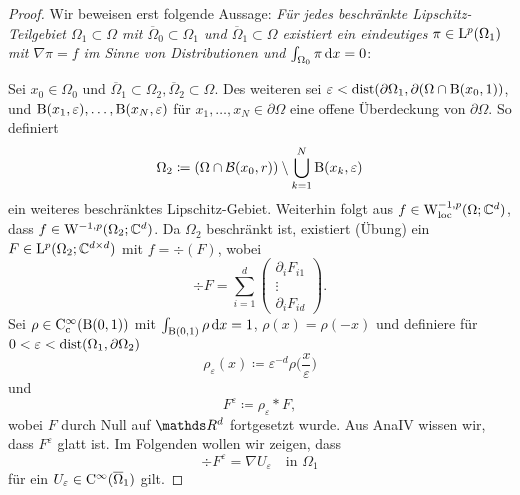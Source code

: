 \begin{proof}
  Wir beweisen erst folgende Aussage: \emph{Für jedes beschränkte Lipschitz-Teilgebiet $\Omega_1 \subset \Omega$ mit $\overline\Omega_0 \subset \Omega_1$ und $\overline\Omega_1 \subset \Omega$ existiert ein eindeutiges $\pi \in \mathrm{L}^p(\Omega_1)$ mit $\nabla\pi = f$ im Sinne von Distributionen und $\int_{\Omega_0} \pi \, {\operatorname{d}\!{x}} = 0$}:

  Sei $x_0 \in \Omega_0$ und $\overline\Omega_1 \subset \Omega_2, \overline\Omega_2 \subset \Omega$.
  Des weiteren sei $\varepsilon < \operatorname{dist}(\partial\Omega_1, \partial(\Omega \cap \mathrm{B}(x_0,1))$, und $\mathrm{B}(x_1,\varepsilon),\dots,\mathrm{B}(x_N,\varepsilon)$ für $x_1,\dots,x_N \in \partial\Omega$ eine offene Überdeckung von $\partial\Omega$.
  So definiert
  $$
  \Omega_2 \coloneqq (\Omega \cap \mathcal{B}(x_0, r)) \setminus \bigcup_{k = 1}^N \mathrm{B}(x_k , \varepsilon)
  $$
  ein weiteres beschränktes Lipschitz-Gebiet.
  Weiterhin folgt aus $f \in \mathrm{W}_{\operatorname{loc}}^{-1,p}(\Omega; \mathbb{C}^d)$, dass $f \in \mathrm{W}^{-1,p}(\Omega_2; \mathbb{C}^d)$.
  Da $\Omega_2$ beschränkt ist, existiert (Übung) ein $F \in \mathrm{L}^p(\Omega_2; \mathbb{C}^{d\times d})$ mit $f = \div(F)$, wobei
  $$
  \div F = \sum_{i = 1}^d \left( \begin{array}{c} \partial_i F_{i1} \\ \vdots \\ \partial_i F_{id} \end{array} \right).
  $$
  Sei $\rho \in \mathrm{C}_{\mathrm{c}}^\infty(\mathrm{B}(0,1))$ mit $\int_{\mathrm{B}(0,1)} \rho \, {\operatorname{d}\!{x}} = 1$, $\rho(x) = \rho(-x)$ und definiere für $0 < \varepsilon < \operatorname{dist}(\Omega_1, \partial\Omega_2)$
  $$
  \rho_\varepsilon(x) \coloneqq \varepsilon^{-d} \rho\Big(\frac{x}{\varepsilon}\Big)
  $$
  und
  $$
  F^\varepsilon \coloneqq \rho_\varepsilon \ast F,
  $$
  wobei $F$ durch Null auf $\R^d$ fortgesetzt wurde.
  Aus AnaIV wissen wir, dass $F^\varepsilon$ glatt ist.
  Im Folgenden wollen wir zeigen, dass 
  $$
  \div F^\varepsilon = \nabla U_\varepsilon \quad\text{in } \Omega_1
  $$
  für ein $U_\varepsilon \in \mathrm{C}^\infty(\overline\Omega_1)$ gilt.


\end{proof}
